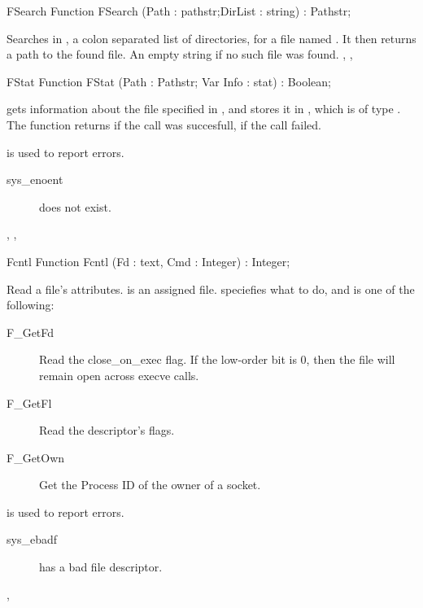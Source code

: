 \html{}
\begin{function}{FSearch}
\Declaration
Function FSearch (Path : pathstr;DirList : string) : Pathstr;

\Description
 Searches in , a colon separated list of directories,
for a file named . It then returns a path to the found file.
\Errors
An empty string if no such file was found.
\SeeAlso
{}, ,  
\end{function}
\latex{}
\html{}
\begin{function}{FStat}
\Declaration
Function FStat (Path : Pathstr; Var Info : stat) : Boolean;

\Description

 gets information about the file specified in , and stores it in 
, which is of type .
The function returns  if the call was succesfull,  if the call
failed.

\Errors
  is used to report errors.
\begin{description}
\item[sys\_enoent]  does not exist.
\end{description}

\SeeAlso
{}, , 
\end{function}
\latex{}
\html{}
\begin{function}{Fcntl}
\Declaration
Function Fcntl (Fd :  text, Cmd : Integer) : Integer;

\Description

Read a file's attributes.  is an assigned file.
 speciefies what to do, and is one of the following:
\begin{description}
\item[F\_GetFd] Read the close\_on\_exec flag. If the low-order bit is 0, then
the file will remain open across execve calls.
\item[F\_GetFl] Read the descriptor's flags.
\item[F\_GetOwn] Get the Process ID of the owner of a socket.
\end{description}

\Errors

 is used to report errors.
\begin{description}
\item[sys\_ebadf]  has a bad file descriptor.
\end{description}

\SeeAlso
{},  
\end{function}

